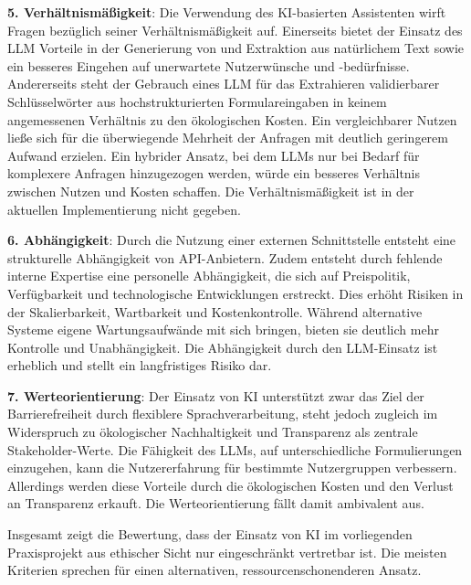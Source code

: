 \begin{description}[noitemsep,topsep=5pt]
    \item \textbf{5. Verhältnismäßigkeit}: Die Verwendung des KI-basierten Assistenten wirft Fragen bezüglich seiner Verhältnismäßigkeit auf. Einerseits bietet der Einsatz des LLM Vorteile in der Generierung von und Extraktion aus natürlichem Text sowie ein besseres Eingehen auf unerwartete Nutzerwünsche und -bedürfnisse. Andererseits steht der Gebrauch eines LLM für das Extrahieren validierbarer Schlüsselwörter aus hochstrukturierten Formulareingaben in keinem angemessenen Verhältnis zu den ökologischen Kosten. Ein vergleichbarer Nutzen ließe sich für die überwiegende Mehrheit der Anfragen mit deutlich geringerem Aufwand erzielen. Ein hybrider Ansatz, bei dem LLMs nur bei Bedarf für komplexere Anfragen hinzugezogen werden, würde ein besseres Verhältnis zwischen Nutzen und Kosten schaffen. Die Verhältnismäßigkeit ist in der aktuellen Implementierung nicht gegeben.
    
    \item \textbf{6. Abhängigkeit}: Durch die Nutzung einer externen Schnittstelle entsteht eine strukturelle Abhängigkeit von API-Anbietern. Zudem entsteht durch fehlende interne Expertise eine personelle Abhängigkeit, die sich auf Preispolitik, Verfügbarkeit und technologische Entwicklungen erstreckt. Dies erhöht Risiken in der Skalierbarkeit, Wartbarkeit und Kostenkontrolle. Während alternative Systeme eigene Wartungsaufwände mit sich bringen, bieten sie deutlich mehr Kontrolle und Unabhängigkeit. Die Abhängigkeit durch den LLM-Einsatz ist erheblich und stellt ein langfristiges Risiko dar.
    
    \item \textbf{7. Werteorientierung}: Der Einsatz von KI unterstützt zwar das Ziel der Barrierefreiheit durch flexiblere Sprachverarbeitung, steht jedoch zugleich im Widerspruch zu ökologischer Nachhaltigkeit und Transparenz als zentrale Stakeholder-Werte. Die Fähigkeit des LLMs, auf unterschiedliche Formulierungen einzugehen, kann die Nutzererfahrung für bestimmte Nutzergruppen verbessern. Allerdings werden diese Vorteile durch die ökologischen Kosten und den Verlust an Transparenz erkauft. Die Werteorientierung fällt damit ambivalent aus.
\end{description}

Insgesamt zeigt die Bewertung, dass der Einsatz von KI im vorliegenden Praxisprojekt aus ethischer Sicht nur eingeschränkt vertretbar ist. Die meisten Kriterien sprechen für einen alternativen, ressourcenschonenderen Ansatz.

